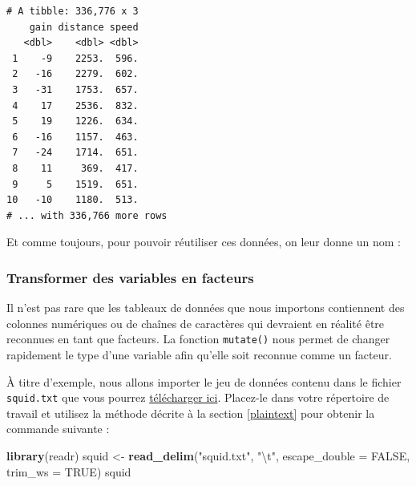 \documentclass[a4paperpaper,]{article}
\newenvironment{Shaded}{\begin{snugshade}}{\end{snugshade}}
\newcommand{\CharTok}[1]{\textcolor[rgb]{0.57,0.30,0.62}{#1}}
\newcommand{\DataTypeTok}[1]{\textcolor[rgb]{0.00,0.34,0.68}{#1}}
\newcommand{\DecValTok}[1]{\textcolor[rgb]{0.69,0.50,0.00}{#1}}
\newcommand{\FloatTok}[1]{\textcolor[rgb]{0.69,0.50,0.00}{#1}}
\newcommand{\KeywordTok}[1]{\textcolor[rgb]{0.12,0.11,0.11}{\textbf{#1}}}
\newcommand{\NormalTok}[1]{\textcolor[rgb]{0.12,0.11,0.11}{#1}}
\newcommand{\OperatorTok}[1]{\textcolor[rgb]{0.12,0.11,0.11}{#1}}
\newcommand{\OtherTok}[1]{\textcolor[rgb]{0.00,0.43,0.16}{#1}}
\newcommand{\StringTok}[1]{\textcolor[rgb]{0.75,0.01,0.01}{#1}}
\begin{document}
\begin{verbatim}
# A tibble: 336,776 x 3
    gain distance speed
   <dbl>    <dbl> <dbl>
 1    -9    2253.  596.
 2   -16    2279.  602.
 3   -31    1753.  657.
 4    17    2536.  832.
 5    19    1226.  634.
 6   -16    1157.  463.
 7   -24    1714.  651.
 8    11     369.  417.
 9     5    1519.  651.
10   -10    1180.  513.
# ... with 336,766 more rows
\end{verbatim}

Et comme toujours, pour pouvoir réutiliser ces données, on leur donne un nom :

\begin{Shaded}
\end{Shaded}

\hypertarget{transformer-des-variables-en-facteurs}{%
\subsubsection{Transformer des variables en facteurs}\label{transformer-des-variables-en-facteurs}}

Il n'est pas rare que les tableaux de données que nous importons contiennent des colonnes numériques ou de chaînes de caractères qui devraient en réalité être reconnues en tant que facteurs. La fonction \texttt{mutate()} nous permet de changer rapidement le type d'une variable afin qu'elle soit reconnue comme un facteur.

À titre d'exemple, nous allons importer le jeu de données contenu dans le fichier \texttt{squid.txt} que vous pourrez \href{data/squid.txt}{télécharger ici}. Placez-le dans votre répertoire de travail et utilisez la méthode décrite à la section \ref{plaintext} pour obtenir la commande suivante :

\begin{Shaded}
\begin{Highlighting}[]
\KeywordTok{library}\NormalTok{(readr)}
\NormalTok{squid <-}\StringTok{ }\KeywordTok{read_delim}\NormalTok{(}\StringTok{"squid.txt"}\NormalTok{, }\StringTok{"}\CharTok{\textbackslash{}t}\StringTok{"}\NormalTok{, }\DataTypeTok{escape_double =} \OtherTok{FALSE}\NormalTok{, }\DataTypeTok{trim_ws =} \OtherTok{TRUE}\NormalTok{)}
\NormalTok{squid}
\end{Highlighting}
\end{Shaded}
\end{document}
